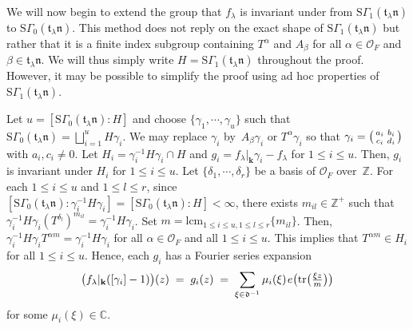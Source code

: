 \documentclass[11pt]{amsart}
\theoremstyle{remark}
\newcommand\sm[1]{\begin{psmallmatrix}#1\end{psmallmatrix}}
\newcommand\mbf[1]{\mathbf{#1}}
\newcommand\fr[1]{\mathfrak{#1}}
\newcommand{\inte}{\mathbb{Z}}
\newcommand{\comp}{\mathbb{C}}
\newcommand{\pos}{\mathbb{Z}^+}
\newcommand{\clo}{\mathcal{O}}
\newcommand{\eq}{\;=\;}
\def\thin{{\hskip 1pt}}
\newcommand{\tr}{\mathrm{tr}}
\newcommand{\lcm}{\mathrm{lcm}}
\newcommand{\SG}{\mathrm{S}\Gamma}
\begin{document}
We will now begin to extend the group that $f_\lambda$ is invariant under from $\SG_1(\fr{t}_\lambda\fr{n})$ to $\SG_0(\fr{t}_\lambda\fr{n})$. This method does not reply on the exact shape of $\SG_1(\fr{t}_\lambda\fr{n})$ but rather that it is a finite index subgroup containing $T^\alpha$ and $A_\beta$ for all $\alpha\in\clo_F$ and $\beta\in\fr{t}_\lambda\fr{n}$. We will thus simply write $H=\SG_1(\fr{t}_\lambda\fr{n})$ throughout the proof. However, it may be possible to simplify the proof using ad hoc properties of $\SG_1(\fr{t}_\lambda\fr{n})$.

Let $u=[\SG_0(\fr{t}_\lambda\fr{n}):H]$ and choose $\{\gamma_1,\cdots,\gamma_u\}$ such that $\SG_0(\fr{t}_\lambda\fr{n})=\bigsqcup_{i=1}^u H\gamma_i$. We may replace $\gamma_i$ by~$A_\beta\gamma_i$ or $T^\alpha\gamma_i$ so that $\gamma_i=\sm{a_i&b_i\\c_i&d_i}$ with $a_i,c_i\neq0$. Let $H_i=\gamma_i^{-1}H\gamma_i\cap H$ and $g_i=f_\lambda|_\mbf{k}\gamma_i-f_\lambda$ for $1\leq i\leq u$. Then, $g_i$ is invariant under $H_i$ for $1\leq i\leq u$. Let $\{\delta_1,\cdots,\delta_r\}$ be a basis of $\clo_F$ over~$\inte$. For each $1\leq i\leq u$ and $1\leq l\leq r$, since \mbox{$[\SG_0(\fr{t}_\lambda\fr{n}):\gamma_i^{-1}H\gamma_i]=[\SG_0(\fr{t}_\lambda\fr{n}):H]<\infty$}, there exists $m_{il}\in\pos$ such that $\gamma_i^{-1}H\gamma_i(T^{\delta_l})^{m_{il}}=\gamma_i^{-1}H\gamma_i$. Set $m=\lcm_{1\leq i\leq u,1\leq l\leq r}\{m_{il}\}$. Then, \mbox{$\gamma_i^{-1}H\gamma_iT^{\alpha m}=\gamma_i^{-1}H\gamma_i$} for all $\alpha\in\clo_F$ and all $1\leq i\leq u$. This implies that $T^{\alpha m}\in H_i$ for all $1\leq i\leq u$. Hence, each $g_i$ has a Fourier series expansion
\begin{align*}
    \big(f_\lambda|_\mbf{k}([\gamma_i]-1)\big)(z)\eq g_i(z)\eq\sum_{\xi\in\fr{d}^{-1}}\mu_i(\xi)\thin e\big(\tr\big(\tfrac{\xi z}{m}\big)\big)
\end{align*}
for some $\mu_i(\xi)\in\comp$.
\end{document}
